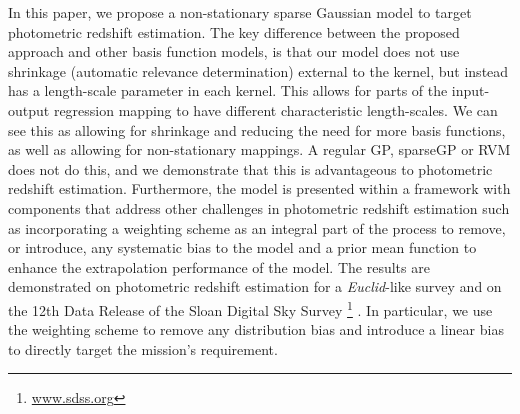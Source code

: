 \documentclass[useAMS,usenatbib,fleqn]{mn2e}
\begin{document}
In this paper, we propose a non-stationary sparse Gaussian model to target photometric redshift estimation. The key difference between the proposed approach and other basis function models, is that our model does not use shrinkage (automatic relevance determination) external to the kernel, but instead has a length-scale parameter in each kernel. This allows for parts of the input-output regression mapping to have different characteristic length-scales. We can see this as allowing for shrinkage and reducing the need for more basis functions, as well as allowing for non-stationary mappings. A regular GP, {\sc sparseGP} or RVM does not do this, and we demonstrate that this is advantageous to photometric redshift estimation. Furthermore, the model is presented within a framework with components that address other challenges in photometric redshift estimation such as incorporating a weighting scheme as an integral part of the process to remove, or introduce, any systematic bias to the model and a prior mean function to enhance the extrapolation performance of the model. The results are demonstrated on photometric redshift estimation for a {\em Euclid}-like survey \citep{laureijs2011} and on the 12th Data Release of the Sloan Digital Sky Survey \citep{SDSS3}\footnote{\url{www.sdss.org}} . In particular, we use the weighting scheme to remove any distribution bias and introduce a linear bias to directly target the mission's requirement. 
\end{document}
